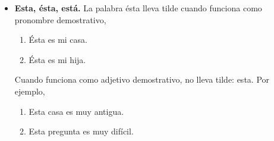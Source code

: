 \documentclass[twocolumn,11pts]{IEEEtran}
\begin{document}
\begin{itemize}
La Ortografía de la lengua española de 2010 nos indica algunas expresiones en las que también es tónico, pero, por carecer de valor interrogativo o exclamativo, se escribe sin tilde, concretamente, cada cual (\ref{ex:cual-1}), que si tal, que si cual (\ref{ex:cual-2}), tal cual (\ref{ex:cual-3}), tal para cual (\ref{ex:cual-4}), un tal y un cual (\ref{ex:cual-5}):
\begin{enumerate}[\itshape]
\item\label{ex:cual-1} Como se ama siempre: cada cual tiene un modo\footnote{Antonio Gala: ¿Por qué corres, Ulises?}
\item\label{ex:cual-2} Se lo dices y empiezan que si tal que si cual\footnote{José Luis Alonso de Santos: Bajarse al moro}
\item\label{ex:cual-3} Todo me inducía a conservar tal cual ese retrato de Johnny\footnote{Julio Cortázar: El perseguidor y otros cuentos}
\item\label{ex:cual-4} También yo soy un aburrido, somos tal para cual\footnote{Álvaro Pombo: El metro de platino iridiado}
\item\label{ex:cual-5} Todos convenían en que era un ladrón, un farsante, un estafador, un tal y un cual\footnote{Javier Salvago: Memorias de un antihéroe}
\end{enumerate}

Tampoco se acentúa gráficamente cuando se puede sustituir por como:
\begin{enumerate}[\itshape]
\item[] Ella traía una de las faldas que cual capas concéntricas acebolladas la recubrían\footnote{Luis Martín Santos: Tiempo de silencio}
\end{enumerate}

\item \textbf{Esta, ésta, está.} La palabra ésta lleva tilde cuando funciona como pronombre demostrativo, 
\begin{enumerate}[\itshape]
\item[] Ésta es mi casa.
\item[] Ésta es mi hija.
\end{enumerate}

Cuando funciona como adjetivo demostrativo, no lleva tilde: esta. Por ejemplo,
\begin{enumerate}[\itshape]
\item[] Esta casa es muy antigua.
\item[] Esta pregunta es muy difícil.
\end{enumerate}


\end{itemize}
\end{document}
